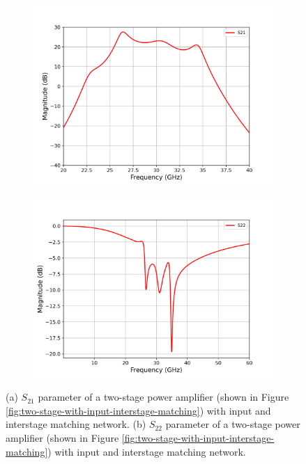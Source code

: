 \begin{figure}[H]
  \centering
  \begin{subfigure}{0.49\textwidth}
    \centering
    \includegraphics[width=\linewidth]{figures/two_stage_withMatching_s21.png}
    \caption{}
    \label{fig:two-stage-withmatching-cadence-s21}
  \end{subfigure}
  \hfill
  \begin{subfigure}{0.49\textwidth}
    \centering
    \includegraphics[width=\linewidth]{figures/two_stage_withMatching_s22.png}
    \caption{}
     \label{fig:two-stage-withmatching-cadence-s22}
  \end{subfigure}
  \caption{(a) $S_{21}$ parameter of a two-stage power amplifier (shown in Figure \ref{fig:two-stage-with-input-interstage-matching}) with input and interstage matching network. (b) $S_{22}$ parameter of a two-stage power amplifier (shown in Figure \ref{fig:two-stage-with-input-interstage-matching}) with input and interstage matching network.}
  \label{fig:two-stage-withmatching-cadence-s21-s22}
\end{figure}

